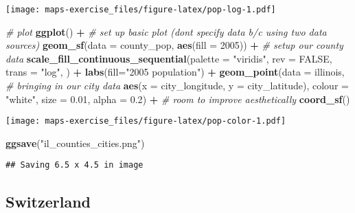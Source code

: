 \documentclass[
]{article}
\newenvironment{Shaded}{\begin{snugshade}}{\end{snugshade}}
\newcommand{\AttributeTok}[1]{\textcolor[rgb]{0.13,0.29,0.53}{#1}}
\newcommand{\CommentTok}[1]{\textcolor[rgb]{0.56,0.35,0.01}{\textit{#1}}}
\newcommand{\ConstantTok}[1]{\textcolor[rgb]{0.56,0.35,0.01}{#1}}
\newcommand{\FloatTok}[1]{\textcolor[rgb]{0.00,0.00,0.81}{#1}}
\newcommand{\FunctionTok}[1]{\textcolor[rgb]{0.13,0.29,0.53}{\textbf{#1}}}
\newcommand{\NormalTok}[1]{#1}
\newcommand{\SpecialCharTok}[1]{\textcolor[rgb]{0.81,0.36,0.00}{\textbf{#1}}}
\newcommand{\StringTok}[1]{\textcolor[rgb]{0.31,0.60,0.02}{#1}}
\begin{document}
\texttt{[image: maps-exercise\_files/figure-latex/pop-log-1.pdf]}

\begin{Shaded}
\begin{Highlighting}[]
\CommentTok{\# plot}
\FunctionTok{ggplot}\NormalTok{() }\SpecialCharTok{+} \CommentTok{\# set up basic plot (don\textquotesingle{}t specify data b/c using two data sources)}
 \FunctionTok{geom\_sf}\NormalTok{(}\AttributeTok{data =}\NormalTok{ county\_pop, }\FunctionTok{aes}\NormalTok{(}\AttributeTok{fill =} \StringTok{\textasciigrave{}}\AttributeTok{2005}\StringTok{\textasciigrave{}}\NormalTok{)) }\SpecialCharTok{+} \CommentTok{\# setup our county data}
 \FunctionTok{scale\_fill\_continuous\_sequential}\NormalTok{(}\AttributeTok{palette =} \StringTok{"viridis"}\NormalTok{, }\AttributeTok{rev =} \ConstantTok{FALSE}\NormalTok{, }\AttributeTok{trans =} \StringTok{"log"}\NormalTok{, ) }\SpecialCharTok{+}
  \FunctionTok{labs}\NormalTok{(}\AttributeTok{fill=}\StringTok{"2005 population"}\NormalTok{) }\SpecialCharTok{+} 
 \FunctionTok{geom\_point}\NormalTok{(}\AttributeTok{data =}\NormalTok{ illinois,  }\CommentTok{\# bringing in our city data}
            \FunctionTok{aes}\NormalTok{(}\AttributeTok{x =}\NormalTok{ city\_longitude, }\AttributeTok{y =}\NormalTok{ city\_latitude), }
            \AttributeTok{colour =} \StringTok{"white"}\NormalTok{, }\AttributeTok{size =} \FloatTok{0.01}\NormalTok{, }\AttributeTok{alpha =} \FloatTok{0.2}\NormalTok{) }\SpecialCharTok{+} \CommentTok{\# room to improve aesthetically}
  \FunctionTok{coord\_sf}\NormalTok{() }
\end{Highlighting}
\end{Shaded}

\texttt{[image: maps-exercise\_files/figure-latex/pop-color-1.pdf]}

\begin{Shaded}
\begin{Highlighting}[]
\FunctionTok{ggsave}\NormalTok{(}\StringTok{"il\_counties\_cities.png"}\NormalTok{)}
\end{Highlighting}
\end{Shaded}

\begin{verbatim}
## Saving 6.5 x 4.5 in image
\end{verbatim}

\hypertarget{switzerland}{%
\subsection{Switzerland}\label{switzerland}}
\end{document}
